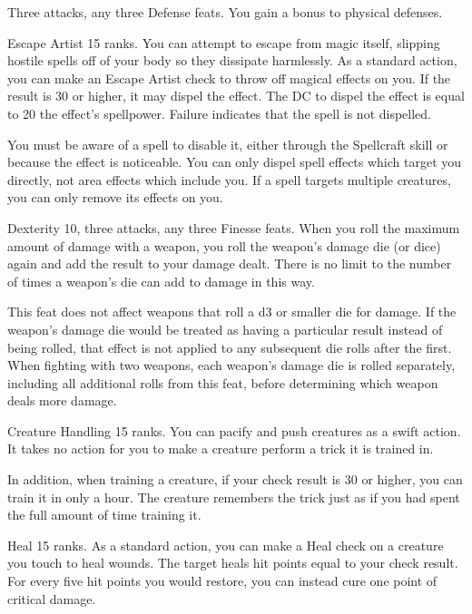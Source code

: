 \featpres Three attacks, any three Defense feats.
\featben You gain a  bonus to physical defenses.

\featpre Escape Artist 15 ranks.
\featben You can attempt to escape from magic itself, slipping hostile spells off of your body so they dissipate harmlessly.
As a standard action, you can make an Escape Artist check to throw off magical effects on you.
If the result is 30 or higher, it may dispel the effect.
The DC to dispel the effect is equal to 20 \add the effect's spellpower.
Failure indicates that the spell is not dispelled.

You must be aware of a spell to disable it, either through the Spellcraft skill or because the effect is noticeable.
You can only dispel spell effects which target you directly, not area effects which include you.
If a spell targets multiple creatures, you can only remove its effects on you.

\featpres Dexterity 10, three attacks, any three Finesse feats.
\featben When you roll the maximum amount of damage with a weapon, you roll the weapon's damage die (or dice) again and add the result to your damage dealt.
There is no limit to the number of times a weapon's die can add to damage in this way.

This feat does not affect weapons that roll a d3 or smaller die for damage.
If the weapon's damage die would be treated as having a particular result instead of being rolled, that effect is not applied to any subsequent die rolls after the first.
When fighting with two weapons, each weapon's damage die is rolled separately, including all additional rolls from this feat, before determining which weapon deals more damage.

\featpre Creature Handling 15 ranks.
\featben You can pacify and push creatures as a swift action.
It takes no action for you to make a creature perform a trick it is trained in.

In addition, when training a creature, if your check result is 30 or higher, you can train it in only a hour.
The creature remembers the trick just as if you had spent the full amount of time training it.

\featpre Heal 15 ranks.
\featben As a standard action, you can make a Heal check on a creature you touch to heal wounds.
The target heals hit points equal to your check result.
For every five hit points you would restore, you can instead cure one point of critical damage.

